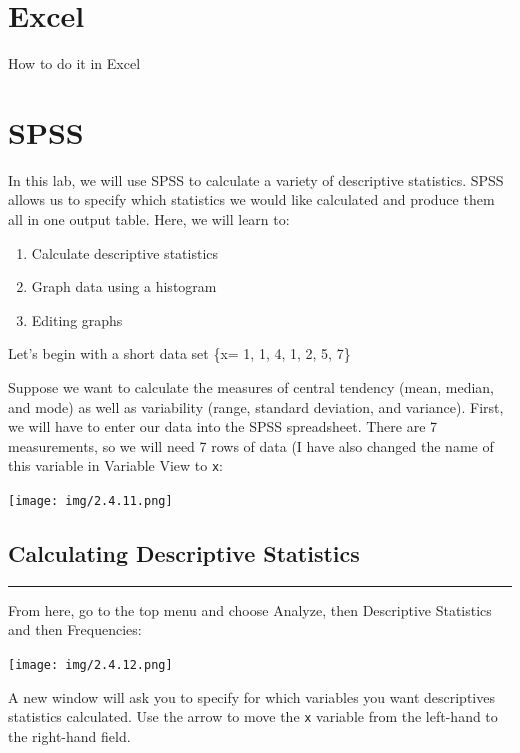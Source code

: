 \documentclass[]{book}
\providecommand{\tightlist}{%
  \setlength{\itemsep}{0pt}\setlength{\parskip}{0pt}}
\begin{document}
\section{Excel}\label{excel-2}

How to do it in Excel

\section{SPSS}\label{spss-2}

In this lab, we will use SPSS to calculate a variety of descriptive
statistics. SPSS allows us to specify which statistics we would like
calculated and produce them all in one output table. Here, we will learn
to:

\begin{enumerate}
\def\labelenumi{\arabic{enumi}.}
\tightlist
\item
  Calculate descriptive statistics
\item
  Graph data using a histogram
\item
  Editing graphs
\end{enumerate}

Let's begin with a short data set \{x= 1, 1, 4, 1, 2, 5, 7\}

Suppose we want to calculate the measures of central tendency (mean,
median, and mode) as well as variability (range, standard deviation, and
variance). First, we will have to enter our data into the SPSS
spreadsheet. There are 7 measurements, so we will need 7 rows of data (I
have also changed the name of this variable in Variable View to
\texttt{x}:

\texttt{[image: img/2.4.11.png]}

\subsection{Calculating Descriptive
Statistics}\label{calculating-descriptive-statistics}

\begin{center}\rule{0.5\linewidth}{0.5pt}\end{center}

From here, go to the top menu and choose {Analyze}, then {Descriptive
Statistics} and then {Frequencies}:

\texttt{[image: img/2.4.12.png]}

A new window will ask you to specify for which variables you want
descriptives statistics calculated. Use the arrow to move the \texttt{x}
variable from the left-hand to the right-hand field.
\end{document}
